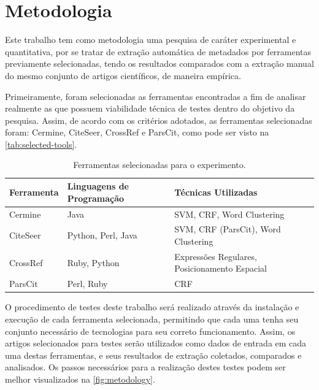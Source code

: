 
\chapter{Metodologia}
\label{cha:methodology}

Este trabalho tem como metodologia uma pesquisa de caráter experimental e quantitativa, por se tratar de extração automática de metadados por ferramentas previamente selecionadas, tendo os resultados comparados com a extração manual do mesmo conjunto de artigos científicos, de maneira empírica.


Primeiramente, foram selecionadas as ferramentas encontradas a fim de analisar realmente as que possuem viabilidade técnica de testes dentro do objetivo da pesquisa. Assim, de acordo com os critérios adotados, as ferramentas selecionadas foram: Cermine, CiteSeer, CrossRef e ParsCit, como pode ser visto na \autoref{tab:selected-tools}.

\begin{table}[h!]
    \caption{Ferramentas selecionadas para o experimento.}
    \begin{center}
        \begin{tabular}{|C{3cm}|C{4cm}|C{6cm}|}
            \hline 
            \textbf{Ferramenta} & \textbf{Linguagens de Programação} & \textbf{Técnicas Utilizadas} \\ 
            \hline 
            Cermine & Java & SVM, CRF, Word Clustering \\ \hline
            CiteSeer & Python, Perl, Java & SVM, CRF (ParsCit), Word Clustering \\ \hline
            CrossRef & Ruby, Python & Expressões Regulares, Posicionamento Espacial \\ \hline
            ParsCit & Perl, Ruby & CRF \\ \hline
        \end{tabular}
    \end{center}
    \label{tab:selected-tools}
\end{table}


O procedimento de testes deste trabalho será realizado através da instalação e execução de cada ferramenta selecionada, permitindo que cada uma tenha seu conjunto necessário de tecnologias para seu correto funcionamento. Assim, os artigos selecionados para testes serão utilizados como dados de entrada em cada uma destas ferramentas, e seus resultados de extração coletados, comparados e analisados. Os passos necessários para a realização destes testes podem ser melhor visualizados na \autoref{fig:metodology}.

